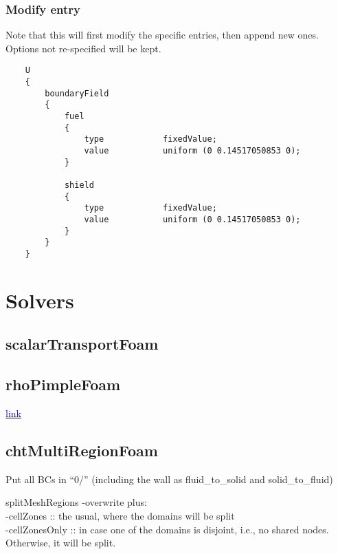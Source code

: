 \documentclass[a4paper, 12pt]{article}
\numberwithin{equation}{section}
\newcommand{\code}{\fontfamily{pcr}\selectfont}
\newcommand{\blue}[1]{\textcolor{blue}{#1}}
\begin{document}
    \subsubsection{Modify entry}

    Note that this will first modify the specific entries, then append new ones. Options not re-specified will be kept.

    \begin{minipage}{\textwidth}
    \vspace{12pt}
    {
    \begin{verbatim}
    U
    {
        boundaryField
        {
            fuel
            {
                type            fixedValue;
                value           uniform (0 0.14517050853 0);
            }

            shield
            {
                type            fixedValue;
                value           uniform (0 0.14517050853 0);
            }
        }
    }
    \end{verbatim}
    }
    \end{minipage}

\clearpage
\section{Solvers}

    \subsection{scalarTransportFoam}

    \subsection{rhoPimpleFoam}

        \href{https://www.openfoam.com/documentation/guides/latest/doc/guide-applications-solvers-compressible-rhoPimpleFoam.html}{\blue{link}}

    \subsection{chtMultiRegionFoam}

        Put all BCs in ``0/'' (including the wall as fluid\_to\_solid and solid\_to\_fluid)

        {\code splitMeshRegions -overwrite} plus: \\
          {\code -cellZones} :: the usual, where the domains will be split \\
          {\code -cellZonesOnly} :: in case one of the domains is disjoint, i.e., no shared nodes. Otherwise, it will be split.
\end{document}
